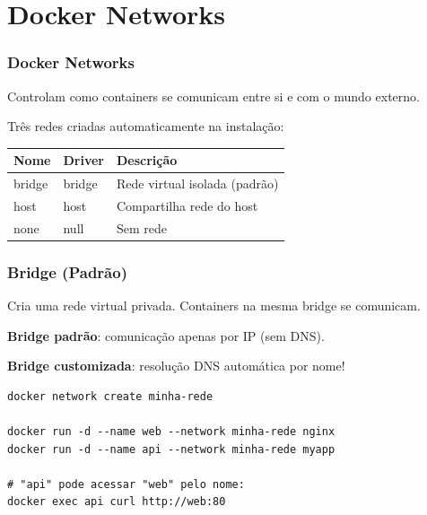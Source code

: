 \section{Docker Networks}

\begin{frame}
  \frametitle{Docker Networks}
  Controlam como containers se comunicam entre si e com o mundo externo.

  \vspace{0.5em}
  Três redes criadas automaticamente na instalação:

  \vspace{0.5em}
  \begin{center}
  \begin{tabular}{|l|l|l|}
  \hline
  \textbf{Nome} & \textbf{Driver} & \textbf{Descrição} \\
  \hline
  bridge & bridge & Rede virtual isolada (padrão) \\
  host & host & Compartilha rede do host \\
  none & null & Sem rede \\
  \hline
  \end{tabular}
  \end{center}
\end{frame}

\begin{frame}[fragile]
  \frametitle{Bridge (Padrão)}
  Cria uma rede virtual privada. Containers na mesma bridge se comunicam.

  \vspace{0.5em}
  \textbf{Bridge padrão}: comunicação apenas por IP (sem DNS).

  \vspace{0.5em}
  \textbf{Bridge customizada}: resolução DNS automática por nome!

  \vspace{0.5em}
\begin{verbatim}
docker network create minha-rede

docker run -d --name web --network minha-rede nginx
docker run -d --name api --network minha-rede myapp

# "api" pode acessar "web" pelo nome:
docker exec api curl http://web:80
\end{verbatim}
\end{frame}

